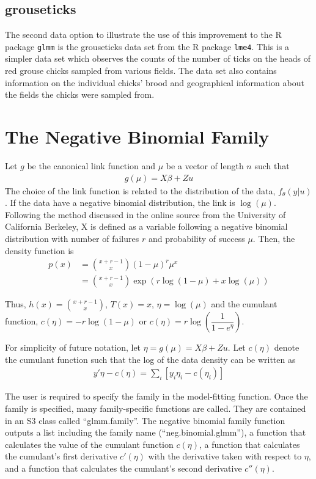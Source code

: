 \documentclass{article}
\begin{document}
        \subsection{grouseticks}
            The second data option to illustrate the use of this improvement to the R package \texttt{glmm} is the grouseticks data set from the R package \texttt{lme4}. This is a simpler data set which observes the counts of the number of ticks on the heads of red grouse chicks sampled from various fields. The data set also contains information on the individual chicks' brood and geographical information about the fields the chicks were sampled from. 

\section{The Negative Binomial Family}
    \noindent Let $g$ be the canonical link function and $\mu$ be a vector of length $n$ such that
    \begin{align}
    g(\mu) = X \beta + Z u
    \end{align}
    The choice of the link function is related to the distribution of the data, $ f_\theta(y|u)$. If the data have a negative binomial distribution, the link is $\log(\mu)$. Following the method discussed in the online source from the University of California Berkeley, X is defined as a variable following a negative binomial distribution with number of failures $r$ and probability of success $\mu$. Then, the density function is 
    \begin{align}
    p(x) &= {x+r-1 \choose x} \left(1-\mu \right)^r \mu^x \\
    &= {x+r-1 \choose x} \exp \left(r \log \left(1-\mu \right) + x \log \left(\mu \right) \right)
    \end{align} 
    
    \noindent Thus, $h(x) = {x+r-1 \choose x}$, $T(x) = x$, $\eta = \log(\mu)$ and the cumulant function, $c(\eta) = -r \log(1-\mu)$ or $c(\eta) = r \log \left( \dfrac{1}{1-e^\eta} \right)$.

    For simplicity of future notation, let $\eta=g(\mu)=X \beta + Z u$. Let $c(\eta)$ denote the cumulant function such that the log of the data density can be written as
    \begin{align}
    y' \eta - c(\eta) = \sum_i \left[ y_i \eta_i - c(\eta_i)  \right]
    \end{align}
    
    The user is required to specify the family in the model-fitting function. Once the family is specified, many family-specific functions are called. They are contained in an S3 class called ``glmm.family''. The negative binomial family function outputs a list including the family name (``neg.binomial.glmm''), a function that calculates the value of the cumulant function $c(\eta)$,  a function that calculates the cumulant's first derivative $c'(\eta)$ with the derivative taken with respect to $\eta$, and  a function that calculates the cumulant's second derivative $c''(\eta)$. 
\end{document}
